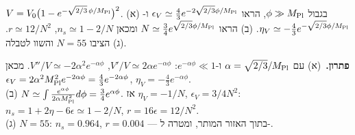 \begin{exercise}{}
$V=V_0\big(1-e^{-\sqrt{2/3}\,\phi/M_{\rm Pl}}\big)^2$. (א) בגבול $\phi\gg M_{\rm Pl}$, הראו $\epsilon_V\simeq\tfrac43e^{-2\sqrt{2/3}\phi/M_{\rm Pl}}$ ו-$\eta_V\simeq-\tfrac43e^{-\sqrt{2/3}\phi/M_{\rm Pl}}$. (ב) הראו $N\simeq\tfrac34e^{\sqrt{2/3}\phi/M_{\rm Pl}}$ ומכאן $n_s\simeq1-2/N$, $r\simeq12/N^2$. (ג) הציבו $N=55$ והשוו לטבלה.
\end{exercise}
\begin{solbox}
\textbf{פתרון.}\ (א) עם $\alpha=\sqrt{2/3}/M_{\rm Pl}$ ו-$e^{-\alpha\phi}\ll1$: $V'/V\simeq2\alpha e^{-\alpha\phi}$, $V''/V\simeq-2\alpha^2e^{-\alpha\phi}$. מכאן $\epsilon_V=2\alpha^2M_{\rm Pl}^2e^{-2\alpha\phi}=\tfrac43e^{-2\alpha\phi}$, $\eta_V=-\tfrac43e^{-\alpha\phi}$.\\
(ב) $N\simeq\int\frac{e^{\alpha\phi}}{2\alpha M_{\rm Pl}^2}d\phi=\tfrac34e^{\alpha\phi}$. אז $\eta_V=-1/N$, $\epsilon_V=3/4N^2$: $n_s=1+2\eta-6\epsilon\simeq1-2/N$, $r=16\epsilon=12/N^2$.\\
(ג) $N=55$: $n_s=0.964$, $r=0.004$ --- בתוך האזור המותר, ומטרה ל-.
\end{solbox}
